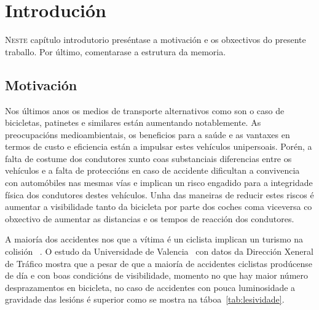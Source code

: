 \chapter{Introdución}
\label{chap:introducion}

\lettrine{N}{este} capítulo introdutorio preséntase a motivación e os obxectivos do presente traballo.
Por último, comentarase a estrutura da memoria.

\section{Motivación}

Nos últimos anos os medios de transporte alternativos como son o caso de bicicletas, patinetes e similares están aumentando notablemente. As preocupacións medioambientais, os beneficios para a saúde e as vantaxes en termos de custo e eficiencia están a impulsar estes vehículos unipersoais. Porén, a falta de costume dos condutores xunto coas substanciais diferencias entre os vehículos e a falta de proteccións en caso de accidente dificultan a convivencia con automóbiles nas mesmas vías e implican un risco engadido para a integridade física dos condutores destes vehículos. Unha das maneiras de reducir estes riscos é aumentar a visibilidade tanto da bicicleta por parte dos coches coma viceversa co obxectivo de aumentar as distancias e os tempos de reacción dos condutores.

A maioría dos accidentes nos que a vítima é un ciclista implican un turismo na colisión~\cite{PrincipalesCifrasSiniestralidad} .
O estudo da Universidade de Valencia~\cite{ESTUDIOANALISISSINIESTRALIDAD} con datos da Dirección Xeneral de Tráfico mostra que a pesar de que a maioría de accidentes ciclistas prodúcense de día e con boas condicións de visibilidade, momento no que hay maior número desprazamentos en bicicleta, no caso de accidentes con pouca luminosidade a gravidade das lesións é superior como se mostra na táboa~\ref{tab:lesividade}.


